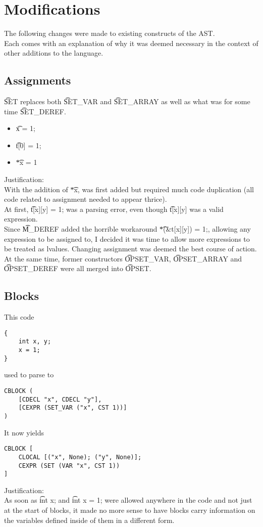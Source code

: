 \section{Modifications}
The following changes were made to existing constructs of the AST.\\
Each comes with an explanation of why it was deemed necessary in the context of other additions to the language.

\subsection{Assignments}
\t{SET} replaces both \t{SET\_VAR} and \t{SET\_ARRAY} as well as what was for some time \t{SET\_DEREF}.\\
\begin{itemize}
    \item \t{x = 1;}
    \not\to\ 
    \to\ 
    \item \t{t[0] = 1;}
    \not\to\ 
    \to\ 
    \item \t{*x = 1}
    \not\to\ 
    \to\ 
\end{itemize}

Justification:\\
With the addition of \t{*x},  was first added but required much code duplication (all code related to assignment needed to appear thrice).\\
At first, \t{t[x][y] = 1;} was a parsing error, even though \t{t[x][y]} was a valid expression.\\
Since \t{M\_DEREF} added the horrible workaround \t{*(\&t[x][y]) = 1;}, allowing any expression to be assigned to, I decided it was time to allow more expressions to be treated as lvalues. Changing assignment was deemed the best course of action.\\
At the same time, former constructors \t{OPSET\_VAR}, \t{OPSET\_ARRAY} and \t{OPSET\_DEREF} were all merged into \t{OPSET}.

\subsection{Blocks}
This code
\begin{verbatim}
{
    int x, y;
    x = 1;
}
\end{verbatim}
used to parse to
\begin{verbatim}
CBLOCK (
    [CDECL "x", CDECL "y"],
    [CEXPR (SET_VAR ("x", CST 1))]
)
\end{verbatim}
It now yields
\begin{verbatim}
CBLOCK [
    CLOCAL [("x", None); ("y", None)];
    CEXPR (SET (VAR "x", CST 1))
]
\end{verbatim}
Justification:\\
As soon as \t{int x;} and \t{int x = 1;} were allowed anywhere in the code and not just at the start of blocks, it made no more sense to have blocks carry information on the variables defined inside of them in a different form.

